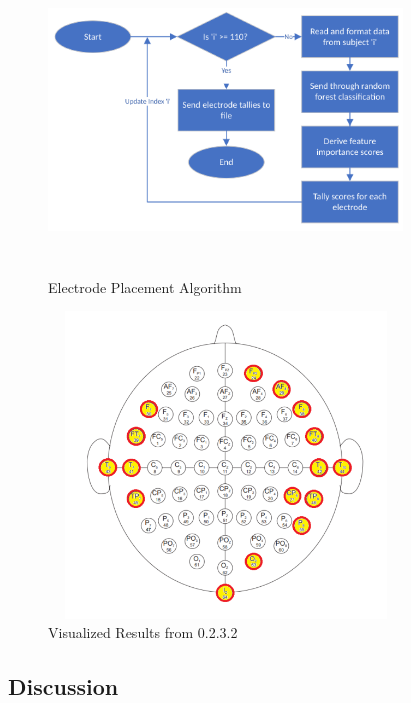 \documentclass[conference]{IEEEtran}
\begin{document}
    \begin{figure}[htbp]
            \centerline{\includegraphics[height=3.2in, width=3.7in]{figs/F/electrode_placement_flowchart.png}}
            \caption{Electrode Placement Algorithm}
            \label{fig:electrode_placement_algorithm}
    \end{figure} 
    \begin{figure}[htbp]
            \centerline{\includegraphics[height=3.2in, width=3.7in]{figs/F/electrode_head_place.png}}
            \caption{Visualized Results from 0.2.3.2}
            \label{fig:electrode_placements}
    \end{figure} 
    \subsection{Discussion}
\end{document}

